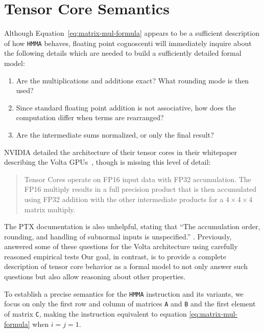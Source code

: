 \section{Tensor Core Semantics}
\label{sec:fasi-case-study}
Although Equation~\ref{eq:matrix-mul-formula} appears to be a sufficient description of how \texttt{HMMA} behaves, floating point cognoscenti will immediately inquire about the following details which are needed to build a sufficiently detailed formal model:    

\begin{enumerate}    
    \item Are the multiplications and additions exact? What rounding mode is then used?
    \item Since standard floating point addition is not associative, how does the computation differ when terms are rearranged?
    \item Are the intermediate sums normalized, or only the final result?
                    \end{enumerate}


NVIDIA detailed the architecture of their tensor cores in their whitepaper describing the Volta GPUs~\cite{volta-whitepaper}, though is missing this level of detail:
\begin{quote}Tensor Cores operate on FP16 input data with FP32 accumulation. The FP16 multiply results in a full precision product that is then accumulated using FP32 addition with the other intermediate products for a $4\times4\times4$ matrix multiply.
\end{quote}

The PTX documentation is also unhelpful, stating that ``The accumulation order, rounding, and handling of subnormal inputs is unspecified.'' \cite[\S9.7.13.4.14]{ptx-isa-73}.  Previously, \citet{fasi2021numerical} answered some of these questions for the Volta architecture using 
carefully reasoned empirical tests
Our goal, in contrast, is to provide a complete description of tensor core behavior
as a formal model to not only answer such questions but also allow reasoning about other properties.


To establish a precise semantics for the \texttt{HMMA} instruction and its variants, we focus on only the first row and column of matrices \texttt{A} and \texttt{B} and the first element of
matrix \texttt{C}, making the instruction equivalent to equation \ref{eq:matrix-mul-formula} when $i=j=1$.


